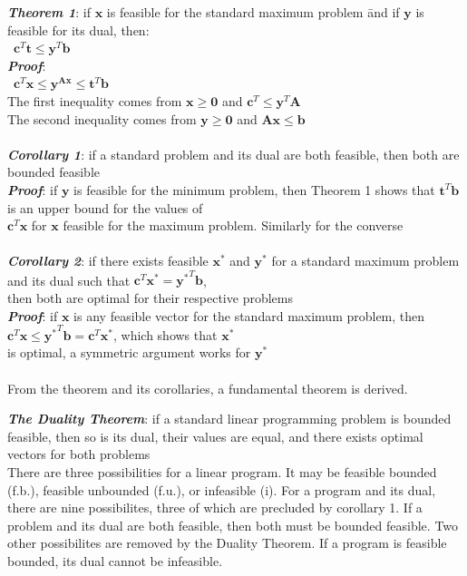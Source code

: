 \documentclass[10pt,letterpaper]{scrartcl}
\newcommand{\boph}[1]{\emph{\textbf{#1}}} %
\begin{document}
	\begin{tabbing}
		\boph{Theorem 1}: if $\mathbf{x}$ is feasible for the standard maximum problem \= and if $\mathbf{y}$ is feasible for its dual, then: \\
		\>\ $\mathbf{c}^T\mathbf{t}\leq\mathbf{y}^T\mathbf{b}$ \\
		\boph{Proof}: \\
		\>\ $\mathbf{c}^T\mathbf{x}\leq\mathbf{y}^\mathbf{Ax}\leq\mathbf{t}^T\mathbf{b}$ \\
		The first inequality comes from $\mathbf{x}\geq \mathbf{0}$ and $\mathbf{c}^T\leq\mathbf{y}^T\mathbf{A}$ \\
		The second inequality comes from $\mathbf{y}\geq\mathbf{0}$ and $\mathbf{Ax}\leq\mathbf{b}$ \\ \\
		\boph{Corollary 1}: if a standard problem and its dual are both feasible, then both are bounded feasible \\
		\boph{Proof}: if $\mathbf{y}$ is feasible for the minimum problem, then Theorem 1 shows that $\mathbf{t}^T\mathbf{b}$ is an upper bound for the values of \\ $\mathbf{c}^T\mathbf{x}$ for $\mathbf{x}$ feasible for the maximum problem. Similarly for the converse \\ \\
		\boph{Corollary 2}: if there exists feasible $\mathbf{x^{*}}$ and $\mathbf{y^{*}}$ for a standard maximum problem and its dual such that $\mathbf{c}^T\mathbf{x^{*}}=\mathbf{y^{*}}^T\mathbf{b}$, \\ then both are optimal for their respective problems \\
		\boph{Proof}: if $\mathbf{x}$ is any feasible vector for the standard maximum problem, then $\mathbf{c}^T\mathbf{x}\leq\mathbf{y^{*}}^T\mathbf{b}=\mathbf{c}^T\mathbf{x^{*}}$, which shows that $\mathbf{x^{*}}$ \\ is optimal, a symmetric argument works for $\mathbf{y^{*}}$\\ \\
		From the theorem and its corollaries, a fundamental theorem is derived.\end{tabbing}
		\boph{The Duality Theorem}: if a standard linear programming problem is bounded feasible, then so is its dual, their values are equal, and there exists optimal vectors for both problems \\
		There are three possibilities for a linear program. It may be feasible bounded (f.b.), feasible unbounded (f.u.), or infeasible (i). For a program and its dual, there are nine possibilites, three of which are precluded by corollary 1. If a problem and its dual are both feasible, then both must be bounded feasible. Two other possibilites are removed by the Duality Theorem. If a program is feasible bounded, its dual cannot be infeasible. \\
\end{document}
